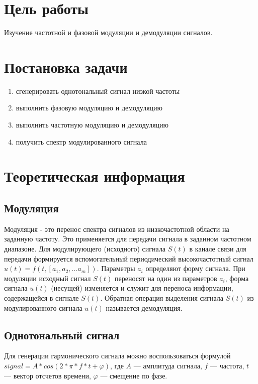 





\section{Цель работы}
Изучение частотной и фазовой модуляции и демодуляции сигналов.
\section{Постановка задачи}
\begin{enumerate}
\item  сгенерировать однотональный сигнал низкой частоты 
\item  выполнить фазовую модуляцию и демодуляцию 
\item  выполнить частотную модуляцию и демодуляцию 
\item  получить спектр модулированного сигнала
\end{enumerate}

\section{Теоретическая информация}

\subsection{Модуляция}
Модуляция - это перенос спектра сигналов из низкочастотной области на заданную частоту. 
Это применяется для передачи сигнала в заданном частотном диапазоне.
Для модулирующего (исходного) сигнала $ S(t) $ в канале связи для передачи формируется  вспомогательный периодический высокочастотный сигнал $u(t)=f(t, [a_1,   a_2,   ...   a_m])$. Параметры $a_i$ определяют форму сигнала. 
При модуляции исходный сигнал $S(t)$ переносят на один из параметров $a_i$, форма сигнала $u(t)$ (несущей) изменяется и 
служит для переноса информации, содержащейся в сигнале $S(t)$. Обратная операция выделения сигнала $S(t)$ из 
модулированного сигнала $u(t)$ называется демодуляция.

\subsection{Однотональный сигнал}

Для генерации гармонического сигнала можно воспользоваться формулой\\ $signal = A*cos(2*\pi * f*t + \varphi)$,
 где $ A $ --- амплитуда сигнала, $f$ --- частота, $t$ --- вектор отсчетов времени, $\varphi$ --- смещение по фазе.

